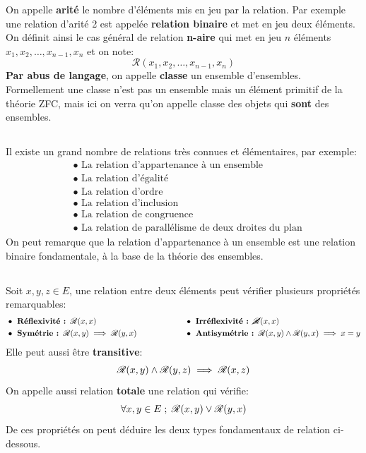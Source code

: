 On appelle \textbf{arité} le nombre d'éléments mis en jeu par la relation.\+ Par exemple une relation d'arité 2 est appelée \textbf{relation binaire} et met en jeu deux éléments. On définit ainsi le cas général de relation \textbf{n-aire} qui met en jeu \(n\) éléments \(x_1, x_2, \ldots, x_{n-1}, x_n\) et on note:
\[
    \mathscr{R}(x_1, x_2, \ldots, x_{n-1}, x_n)
\]
\textbf{Par abus de langage}, on appelle \textbf{classe} un ensemble d'ensembles.\+
Formellement une classe n'est pas un ensemble mais un élément primitif de la théorie ZFC, mais ici on verra qu'on appelle classe des objets qui \textbf{sont} des ensembles.

\subsection*{}
Il existe un grand nombre de relations très connues et élémentaires, par exemple:
\begin{align*}
    &\bullet \text{ La relation d'appartenance à un ensemble} \\
    &\bullet \text{ La relation d'égalité} \\
    &\bullet \text{ La relation d'ordre} \\
    &\bullet \text{ La relation d'inclusion} \\
    &\bullet \text{ La relation de congruence} \\
    &\bullet \text{ La relation de parallélisme de deux droites du plan}
\end{align*}
On peut remarque que la relation d'appartenance à un ensemble est une relation binaire fondamentale, à la base de la théorie des ensembles.

\subsection*{}
Soit \(x, y, z \in E\), une relation entre deux éléments peut vérifier plusieurs propriétés remarquables:
\[
    \begin{aligned}
        &\bullet \textbf{ Réflexivité : } \mathscr{R}(x, x)\\
        &\bullet \textbf{ Symétrie : } \mathscr{R}(x, y) \implies \mathscr{R}(y, x)\\
    \end{aligned}
    \hspace{60pt}
    \begin{aligned}
        &\bullet \textbf{ Irréflexivité : } \cancel{\mathscr{R}}(x, x)\\
        &\bullet \textbf{ Antisymétrie : } \mathscr{R}(x, y) \land \mathscr{R}(y, x) \implies x = y \\
    \end{aligned}
\]
Elle peut aussi être \textbf{transitive}:
\[
    \mathscr{R}(x, y) \land \mathscr{R}(y, z) \implies \mathscr{R}(x, z)\\
\]
On appelle aussi relation \textbf{totale} une relation qui vérifie:
\[
    \forall x, y \in E \; ; \; \mathscr{R}(x, y) \lor \mathscr{R}(y, x)\\
\]
De ces propriétés on peut déduire les deux types fondamentaux de relation ci-dessous.
\pagebreak

